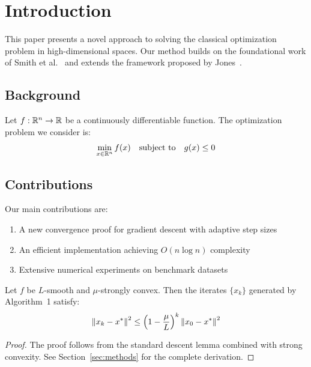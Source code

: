 \section{Introduction}
\label{sec:intro}

This paper presents a novel approach to solving the classical optimization problem
in high-dimensional spaces. Our method builds on the foundational work of
Smith et al.~\cite{smith2020} and extends the framework proposed by
Jones~\cite{jones2019}.

\subsection{Background}
Let $f: \mathbb{R}^n \to \mathbb{R}$ be a continuously differentiable function. The optimization
problem we consider is:
\begin{equation}
    \min_{x \in \mathbb{R}^n} f(x) \quad \text{subject to} \quad g(x) \leq 0
    \label{eq:opt}
\end{equation}

\subsection{Contributions}
Our main contributions are:
\begin{enumerate}
    \item A new convergence proof for gradient descent with adaptive step sizes
    \item An efficient implementation achieving $O(n \log n)$ complexity
    \item Extensive numerical experiments on benchmark datasets
\end{enumerate}

\begin{theorem}
\label{thm:main}
Let $f$ be $L$-smooth and $\mu$-strongly convex. Then the iterates $\{x_k\}$
generated by Algorithm~1 satisfy:
\[
    \left\| x_k - x^* \right\|^2 \leq \left(1 - \frac{\mu}{L}\right)^k \left\| x_0 - x^* \right\|^2
\]
\end{theorem}

\begin{proof}
The proof follows from the standard descent lemma combined with strong convexity.
See Section~\ref{sec:methods} for the complete derivation.
\end{proof}
